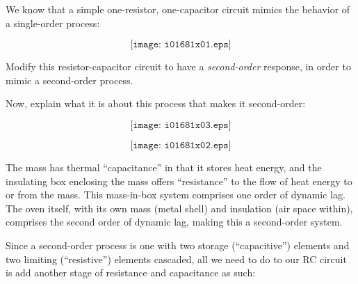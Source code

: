 

We know that a simple one-resistor, one-capacitor circuit mimics the behavior of a single-order process:

$$\texttt{[image: i01681x01.eps]}$$

Modify this resistor-capacitor circuit to have a {\it second-order} response, in order to mimic a second-order process.

\vskip 10pt

Now, explain what it is about this process that makes it second-order:

$$\texttt{[image: i01681x03.eps]}$$







$$\texttt{[image: i01681x02.eps]}$$

The mass has thermal ``capacitance'' in that it stores heat energy, and the insulating box enclosing the mass offers ``resistance'' to the flow of heat energy to or from the mass.  This mass-in-box system comprises one order of dynamic lag.  The oven itself, with its own mass (metal shell) and insulation (air space within), comprises the second order of dynamic lag, making this a second-order system.







Since a second-order process is one with two storage (``capacitive'') elements and two limiting (``resistive'') elements cascaded, all we need to do to our RC circuit is add another stage of resistance and capacitance as such:




